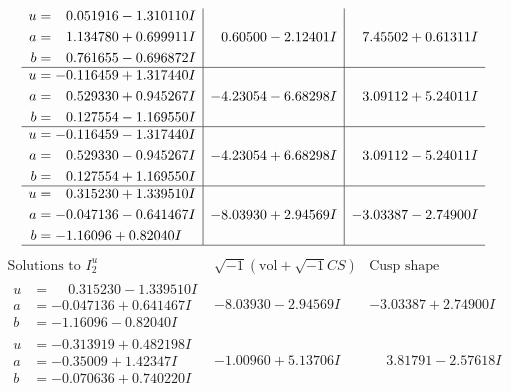 \documentclass[1p]{elsarticle_modified}
\theoremstyle{definition}
\newcommand{\I}{\sqrt{-1}}
\begin{document}
$$\begin{array}{c|c|c}
\begin{aligned}
u &= \phantom{-}0.051916 - 1.310110 I \\
a &= \phantom{-}1.134780 + 0.699911 I \\
b &= \phantom{-}0.761655 - 0.696872 I\end{aligned}
 & \phantom{-}0.60500 - 2.12401 I & \phantom{-}7.45502 + 0.61311 I \\ \hline\begin{aligned}
u &= -0.116459 + 1.317440 I \\
a &= \phantom{-}0.529330 + 0.945267 I \\
b &= \phantom{-}0.127554 - 1.169550 I\end{aligned}
 & -4.23054 - 6.68298 I & \phantom{-}3.09112 + 5.24011 I \\ \hline\begin{aligned}
u &= -0.116459 - 1.317440 I \\
a &= \phantom{-}0.529330 - 0.945267 I \\
b &= \phantom{-}0.127554 + 1.169550 I\end{aligned}
 & -4.23054 + 6.68298 I & \phantom{-}3.09112 - 5.24011 I \\ \hline\begin{aligned}
u &= \phantom{-}0.315230 + 1.339510 I \\
a &= -0.047136 - 0.641467 I \\
b &= -1.16096 + 0.82040 I\end{aligned}
 & -8.03930 + 2.94569 I & -3.03387 - 2.74900 I\\
 \hline 
 \end{array}$$\newpage$$\begin{array}{c|c|c}  
\text{Solutions to }I^u_{2}& \I (\text{vol} + \sqrt{-1}CS) & \text{Cusp shape}\\
 \hline 
\begin{aligned}
u &= \phantom{-}0.315230 - 1.339510 I \\
a &= -0.047136 + 0.641467 I \\
b &= -1.16096 - 0.82040 I\end{aligned}
 & -8.03930 - 2.94569 I & -3.03387 + 2.74900 I \\ \hline\begin{aligned}
u &= -0.313919 + 0.482198 I \\
a &= -0.35009 + 1.42347 I \\
b &= -0.070636 + 0.740220 I\end{aligned}
 & -1.00960 + 5.13706 I & \phantom{-}3.81791 - 2.57618 I \\ \hline\begin{aligned}

\end{aligned}
\end{array}$$
\end{document}
